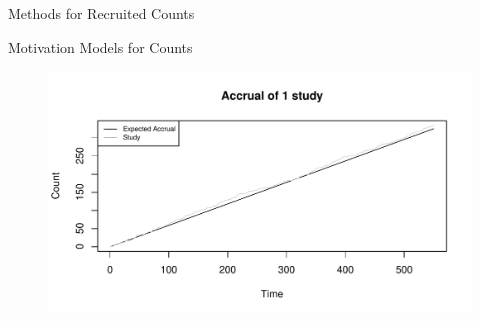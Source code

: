 \documentclass[english]{beamer}\usepackage[]{graphicx}\usepackage[]{xcolor}
\makeatletter
\def\maxwidth{ %
  \ifdim\Gin@nat@width>\linewidth
    \linewidth
  \else
    \Gin@nat@width
  \fi
}
\newenvironment{knitrout}{}{} %
\makeatother
\begin{document}
\begin{frame}{Methods for Recruited Counts}

\end{frame}

\begin{frame}{Motivation Models for Counts}
\begin{figure}
\begin{knitrout}
\color{fgcolor}
\includegraphics[width=\maxwidth]{figures/figunnamed-chunk-2-1} 
\end{knitrout}

\end{figure}

\end{frame}
\end{document}

